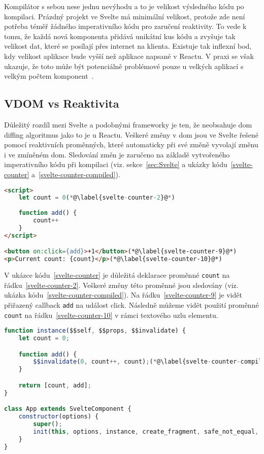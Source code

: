 Kompilátor s sebou nese jednu nevýhodu a to je velikost výsledného kódu po kompilaci.
Prázdný projekt ve Svelte má minimální velikost, protože zde není potřeba téměř žádného imperativního kódu pro zaručení reaktivity.
To vede k tomu, že každá nová komponenta přidává unikátní kus kódu a zvyšuje tak velikost dat, které se posílají přes internet na klienta.
Existuje tak inflexní bod, kdy velikost aplikace bude vyšší než aplikace napsané v Reactu.
V praxi se však ukazuje, že toto může být potenciálně problémové pouze u velkých aplikací s velkým počtem komponent~\cite{svelte-scaling}.
\subsection{VDOM vs Reaktivita}

Důležitý rozdíl mezi Svelte a podobnými frameworky je ten, že neobsahuje \gls{dom} diffing algoritmus jako to je u Reactu.
Veškeré změny v \gls{dom} jsou ve Svelte řešené pomocí reaktivních proměnných, které automaticky při své změně vyvolají změnu i ve zmíněném \gls{dom}.
Sledování změn je zaručeno na základě vytvořeného imperativního kódu při kompilaci (viz. sekce~\ref{sec:Svelte} a ukázky kódu~\ref{svelte-counter} a~\ref{svelte-counter-compiled}).

\begin{lstlisting}[caption={Počítadlo ve Svelte 4}, label={svelte-counter}, language=html]
<script>
	let count = 0(*@\label{svelte-counter-2}@*)
	
	function add() {
		count++
	}
</script>

<button on:click={add}>+1</button>(*@\label{svelte-counter-9}@*)
<p>Current count: {count}</p>(*@\label{svelte-counter-10}@*)
\end{lstlisting}

V ukázce kódu~\ref{svelte-counter} je důležitá deklarace proměnné \texttt{count} na řádku~\ref{svelte-counter-2}.
Veškeré změny této proměnné jsou sledovány (viz. ukázka kódu~\ref{svelte-counter-compiled}).
Na řádku~\ref{svelte-counter-9} je vidět přiřazený callback \texttt{add} na událost click.
Následně můžeme vidět použití proměnné \texttt{count} na řádku~\ref{svelte-counter-10} v rámci textového uzlu elementu.

\clearpage

\begin{lstlisting}[caption={Počítadlo po kompilaci}, label={svelte-counter-compiled}, language=JavaScript]
function instance($$self, $$props, $$invalidate) {
    let count = 0;

    function add() {
        $$invalidate(0, count++, count);(*@\label{svelte-counter-compiled-5}@*)
    }

    return [count, add];
}

class App extends SvelteComponent {
    constructor(options) {
        super();
        init(this, options, instance, create_fragment, safe_not_equal, {});
    }
}
\end{lstlisting}

